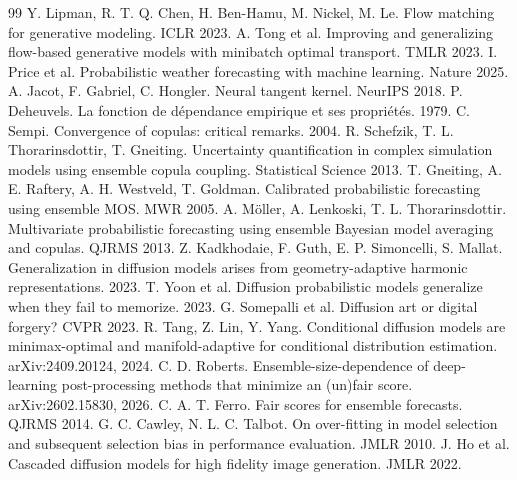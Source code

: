 \documentclass[11pt]{article}
\begin{document}

\begin{thebibliography}{99}
 Y. Lipman, R. T. Q. Chen, H. Ben-Hamu, M. Nickel, M. Le. Flow matching for generative modeling. ICLR 2023.
 A. Tong et al. Improving and generalizing flow-based generative models with minibatch optimal transport. TMLR 2023.
 I. Price et al. Probabilistic weather forecasting with machine learning. Nature 2025.
 A. Jacot, F. Gabriel, C. Hongler. Neural tangent kernel. NeurIPS 2018.
 P. Deheuvels. La fonction de d\'ependance empirique et ses propri\'et\'es. 1979.
 C. Sempi. Convergence of copulas: critical remarks. 2004.
 R. Schefzik, T. L. Thorarinsdottir, T. Gneiting. Uncertainty quantification in complex simulation models using ensemble copula coupling. Statistical Science 2013.
 T. Gneiting, A. E. Raftery, A. H. Westveld, T. Goldman. Calibrated probabilistic forecasting using ensemble MOS. MWR 2005.
 A. M\"oller, A. Lenkoski, T. L. Thorarinsdottir. Multivariate probabilistic forecasting using ensemble Bayesian model averaging and copulas. QJRMS 2013.
 Z. Kadkhodaie, F. Guth, E. P. Simoncelli, S. Mallat. Generalization in diffusion models arises from geometry-adaptive harmonic representations. 2023.
 T. Yoon et al. Diffusion probabilistic models generalize when they fail to memorize. 2023.
 G. Somepalli et al. Diffusion art or digital forgery? CVPR 2023.
 R. Tang, Z. Lin, Y. Yang. Conditional diffusion models are minimax-optimal and manifold-adaptive for conditional distribution estimation. arXiv:2409.20124, 2024.
 C. D. Roberts. Ensemble-size-dependence of deep-learning post-processing methods that minimize an (un)fair score. arXiv:2602.15830, 2026.
 C. A. T. Ferro. Fair scores for ensemble forecasts. QJRMS 2014.
 G. C. Cawley, N. L. C. Talbot. On over-fitting in model selection and subsequent selection bias in performance evaluation. JMLR 2010.
 J. Ho et al. Cascaded diffusion models for high fidelity image generation. JMLR 2022.
\end{thebibliography}
\end{document}

